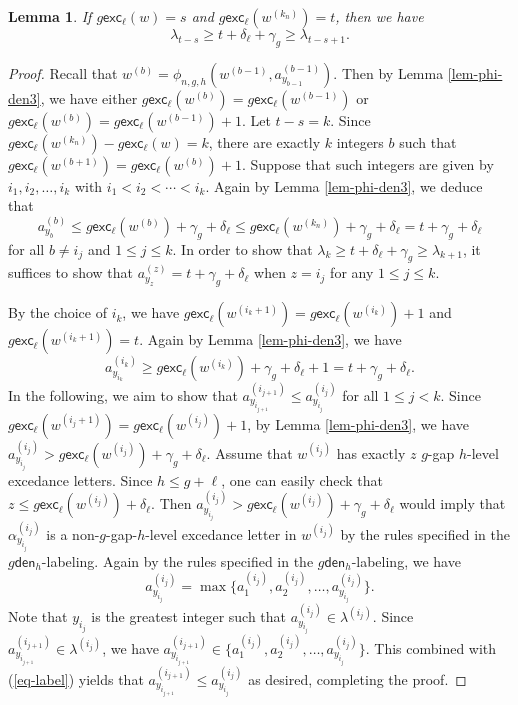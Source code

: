 \documentclass[12pt]{article}
\numberwithin{equation}{section}
\theoremstyle{plain}
\newtheorem{lemma}[theorem]{Lemma}
\def\exc{\mathsf{exc}}
\def\den{\mathsf{den}}
\begin{document}
\begin{lemma}\label{lem-Phi-den2}
 If $g\exc_\ell(w)=s$ and $g\exc_\ell(w^{(k_n)})=t$, then we have
$$
	\lambda_{t-s}\geq t+\delta_\ell+\gamma_g \geq \lambda_{t-s+1}.
 $$
 	
	\end{lemma}
  \begin{proof}
  	Recall that  $w^{(b)}=\phi_{n,g,h}(w^{(b-1)}, a^{(b-1)}_{y_{b-1}})$. Then by Lemma \ref{lem-phi-den3},  we     have either  $g\exc_\ell(w^{(b)})=g\exc_\ell(w^{(b-1)})$ or $g\exc_\ell(w^{(b)})=g\exc_\ell(w^{(b-1)})+1$. 
  	Let $t-s=k$. 
  	 Since $g\exc_\ell(w^{(k_n)})-g\exc_\ell(w)=k$,   there are exactly $k$  integers $b$ such that $g\exc_\ell(w^{(b+1)})=g\exc_\ell(w^{(b)})+1$.    
  	Suppose that such integers are given by  $i_1, i_2, \ldots, i_{k}$ with $i_1<i_2<\cdots<i_{k}$.  
  	  Again by Lemma \ref{lem-phi-den3}, we deduce that  
  	  $$a^{(b)}_{y_{b}}\leq g\exc_\ell(w^{(b)})+\gamma_g+\delta_\ell\leq g\exc_\ell(w^{(k_n)})+\gamma_g+\delta_\ell=t+\gamma_g+\delta_\ell$$ for all 
  	  $b\neq i_j $ and $1\leq j\leq k$.  In order to show that 	$\lambda_{k}\geq t+\delta_\ell+\gamma_g \geq \lambda_{k+1}$, it suffices to show that 	$a^{(z)}_{y_{z}}= t+\gamma_g+\delta_\ell $  when  $z=i_j$ for  any $1\leq j\leq k$. 
  	  
  	  
  	  
  	   
  	   By the choice of $i_k$,  we have $g\exc_\ell(w^{(i_k+1)})=g\exc_\ell(w^{(i_k)})+1$  and $g\exc_\ell(w^{(i_k+1)})=t$.  
  	Again by  Lemma \ref{lem-phi-den3}, we have
  	$$
  	a^{(i_{k})}_{y_{{i_{k}}}}\geq   g\exc_\ell(w^{(i_{k})})+\gamma_g+\delta_\ell +1=  t+\gamma_g+\delta_\ell. 
  	$$
   In the following, we aim to show that
  		$a^{(i_{j+1})}_{y_{{i_{j+1}}}}\leq a^{(i_{j})}_{y_{{i_{j}}}}$ for all $1\leq j <k$. 
  	Since $g\exc_\ell(w^{(i_{j}+1)})=g\exc_\ell(w^{(i_j)})+1$, by Lemma \ref{lem-phi-den3}, we have $a^{(i_{j})}_{y_{{i_{j}}}}> g\exc_\ell(w^{(i_{j})})+\gamma_g+\delta_\ell $. 
  	Assume that $w^{(i_{j})}$ has exactly $z$ $g$-gap $h$-level excedance letters. 
  	Since $h\leq g+\ell$,  one can easily check that $z\leq g\exc_\ell(w^{(i_j)})+\delta_\ell$. Then $a^{(i_{j})}_{y_{{i_{j}}}}> g\exc_\ell(w^{(i_{j})})+\gamma_g+\delta_\ell $ would imply that $\alpha^{(i_j)}_{y_{i_j}}$  is a non-$g$-gap-$h$-level excedance letter in $w^{(i_j)}$ by the rules specified in the $g\den_h$-labeling.    Again by the rules specified in the $g\den_{h}$-labeling, we have
  	\begin{equation}\label{eq-label}
  	a^{(i_j)}_{y_{i_j}}=\max\{a^{(i_j)}_1,  a^{(i_j)}_2, \ldots, a^{(i_j)}_{y_{i_j}}\}. 
  	\end{equation}
  	Note that $y_{i_j}$ is the greatest integer    such that $a^{(i_j)}_{y_{i_j}}\in \lambda^{(i_j)}$.  Since $a^{(i_{j+1})}_{y_{i_{j+1}}}\in \lambda^{(i_j)}$,   we have $a^{(i_{j+1})}_{y_{i_{j+1}}}\in \{a^{(i_j)}_1,  a^{(i_j)}_2, \ldots, a^{(i_j)}_{y_{i_j}}\}.$   This combined with (\ref{eq-label}) yields that 
  	$a^{(i_{j+1})}_{y_{i_{j+1}}}\leq a^{(i_j)}_{y_{i_j}}$ as desired, 
  	completing the proof. 
   
  	\end{proof}
  
\end{document}

